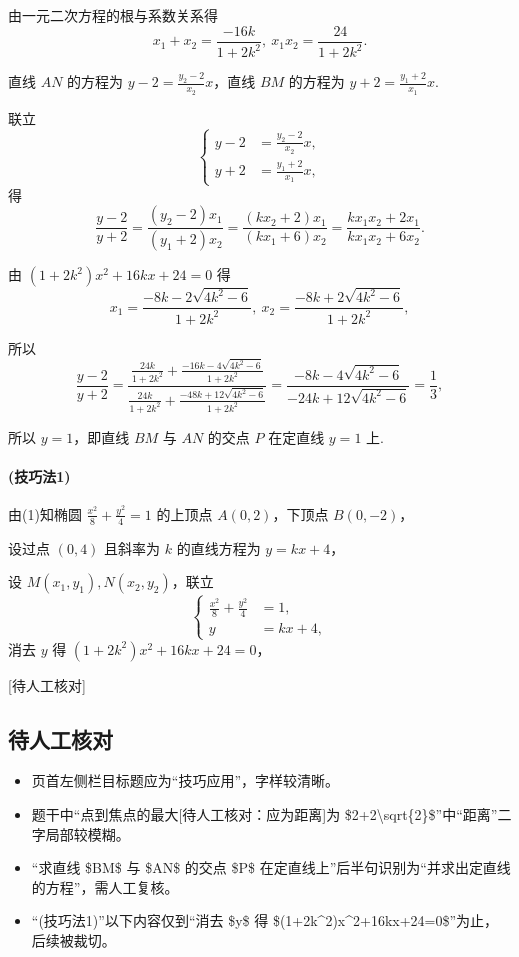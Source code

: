 \documentclass[UTF8,a4paper,11pt]{ctexart}
\begin{document}
由一元二次方程的根与系数关系得
\[
 x_1+x_2=\frac{-16k}{1+2k^2},\ x_1x_2=\frac{24}{1+2k^2}.
\]

直线 $AN$ 的方程为 $y-2=\frac{y_2-2}{x_2}x$，直线 $BM$ 的方程为 $y+2=\frac{y_1+2}{x_1}x$.

联立
\[
\left\{
\begin{aligned}
 y-2&=\frac{y_2-2}{x_2}x,\\
 y+2&=\frac{y_1+2}{x_1}x,
\end{aligned}
\right.
\]
得
\[
\frac{y-2}{y+2}=\frac{(y_2-2)x_1}{(y_1+2)x_2}=\frac{(kx_2+2)x_1}{(kx_1+6)x_2}=\frac{kx_1x_2+2x_1}{kx_1x_2+6x_2}.
\]

由 $(1+2k^2)x^2+16kx+24=0$ 得
\[
 x_1=\frac{-8k-2\sqrt{4k^2-6}}{1+2k^2},\ x_2=\frac{-8k+2\sqrt{4k^2-6}}{1+2k^2},
\]

所以
\[
\frac{y-2}{y+2}=\frac{\frac{24k}{1+2k^2}+\frac{-16k-4\sqrt{4k^2-6}}{1+2k^2}}{\frac{24k}{1+2k^2}+\frac{-48k+12\sqrt{4k^2-6}}{1+2k^2}}=\frac{-8k-4\sqrt{4k^2-6}}{-24k+12\sqrt{4k^2-6}}=\frac{1}{3},
\]

所以 $y=1$，即直线 $BM$ 与 $AN$ 的交点 $P$ 在定直线 $y=1$ 上.

\paragraph{(技巧法1)}由(1)知椭圆 $\frac{x^2}{8}+\frac{y^2}{4}=1$ 的上顶点 $A(0,2)$，下顶点 $B(0,-2)$，

设过点 $(0,4)$ 且斜率为 $k$ 的直线方程为 $y=kx+4$，

设 $M(x_1,y_1),N(x_2,y_2)$，联立
\[
\left\{
\begin{aligned}
\frac{x^2}{8}+\frac{y^2}{4}&=1,\\
y&=kx+4,
\end{aligned}
\right.
\]
消去 $y$ 得 $(1+2k^2)x^2+16kx+24=0$，

[待人工核对]

\subsection*{待人工核对}

\begin{itemize}

\item 页首左侧栏目标题应为“技巧应用”，字样较清晰。

\item 题干中“点到焦点的最大[待人工核对：应为距离]为 \$2+2\textbackslash{}sqrt\{2\}\$”中“距离”二字局部较模糊。

\item “求直线 \$BM\$ 与 \$AN\$ 的交点 \$P\$ 在定直线上”后半句识别为“并求出定直线的方程”，需人工复核。

\item “(技巧法1)”以下内容仅到“消去 \$y\$ 得 \$(1+2k\textasciicircum{}2)x\textasciicircum{}2+16kx+24=0\$”为止，后续被裁切。

\end{itemize}
\end{document}

